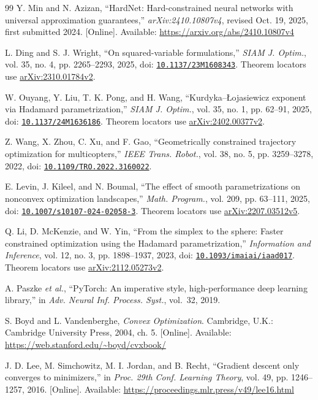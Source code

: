 \documentclass[pdflatex,sn-mathphys-num]{sn-jnl}
\begin{document}
\begin{thebibliography}{99}
 Y. Min and N. Azizan, ``HardNet: Hard-constrained neural networks with universal approximation guarantees,'' \emph{arXiv:2410.10807v4}, revised Oct. 19, 2025, first submitted 2024. [Online]. Available: \url{https://arxiv.org/abs/2410.10807v4}

 L. Ding and S. J. Wright, ``On squared-variable formulations,'' \emph{SIAM J. Optim.}, vol. 35, no. 4, pp. 2265--2293, 2025, doi: \href{https://doi.org/10.1137/23M1608343}{\nolinkurl{10.1137/23M1608343}}. Theorem locators use \href{https://arxiv.org/abs/2310.01784v2}{arXiv:2310.01784v2}.

 W. Ouyang, Y. Liu, T. K. Pong, and H. Wang, ``Kurdyka--\L{}ojasiewicz exponent via Hadamard parametrization,'' \emph{SIAM J. Optim.}, vol. 35, no. 1, pp. 62--91, 2025, doi: \href{https://doi.org/10.1137/24M1636186}{\nolinkurl{10.1137/24M1636186}}. Theorem locators use \href{https://arxiv.org/abs/2402.00377v2}{arXiv:2402.00377v2}.

 Z. Wang, X. Zhou, C. Xu, and F. Gao, ``Geometrically constrained trajectory optimization for multicopters,'' \emph{IEEE Trans. Robot.}, vol. 38, no. 5, pp. 3259--3278, 2022, doi: \href{https://doi.org/10.1109/TRO.2022.3160022}{\nolinkurl{10.1109/TRO.2022.3160022}}.

 E. Levin, J. Kileel, and N. Boumal, ``The effect of smooth parametrizations on nonconvex optimization landscapes,'' \emph{Math. Program.}, vol. 209, pp. 63--111, 2025, doi: \href{https://doi.org/10.1007/s10107-024-02058-3}{\nolinkurl{10.1007/s10107-024-02058-3}}. Theorem locators use \href{https://arxiv.org/abs/2207.03512v5}{arXiv:2207.03512v5}.

 Q. Li, D. McKenzie, and W. Yin, ``From the simplex to the sphere: Faster constrained optimization using the Hadamard parametrization,'' \emph{Information and Inference}, vol. 12, no. 3, pp. 1898--1937, 2023, doi: \href{https://doi.org/10.1093/imaiai/iaad017}{\nolinkurl{10.1093/imaiai/iaad017}}. Theorem locators use \href{https://arxiv.org/abs/2112.05273v2}{arXiv:2112.05273v2}.

 A. Paszke \emph{et al.}, ``PyTorch: An imperative style, high-performance deep learning library,'' in \emph{Adv. Neural Inf. Process. Syst.}, vol.~32, 2019.

 S. Boyd and L. Vandenberghe, \emph{Convex Optimization}. Cambridge, U.K.: Cambridge University Press, 2004, ch. 5. [Online]. Available: \url{https://web.stanford.edu/~boyd/cvxbook/}

 J. D. Lee, M. Simchowitz, M. I. Jordan, and B. Recht, ``Gradient descent only converges to minimizers,'' in \emph{Proc. 29th Conf. Learning Theory}, vol. 49, pp. 1246--1257, 2016. [Online]. Available: \url{https://proceedings.mlr.press/v49/lee16.html}
\end{thebibliography}
\end{document}
